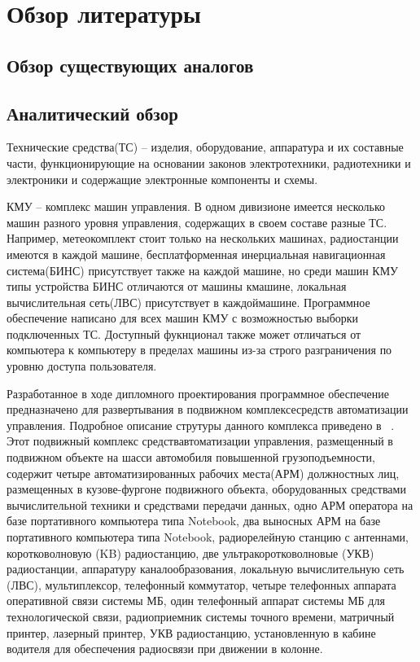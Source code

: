 \section{Обзор литературы}
\label{sec:lit_review}

\subsection{Обзор существующих аналогов}
\label{sub:lit_review:analogues}
\Blindtext

\subsection{Аналитический обзор}
\label{sub:lit_review:analitics}
\begin{minipage}
Технические средства(ТС) --  изделия, оборудование, аппаратура и их составные части, функционирующие на основании законов электротехники, радиотехники и электроники и содержащие электронные компоненты и \break схемы.

КМУ -- комплекс машин управления.
В одном дивизионе имеется несколько машин разного уровня управления, содержащих в своем составе разные ТС.
Например, метеокомплект стоит только на нескольких машинах, радиостанции имеются в каждой машине, бесплатформенная инерциальная навигационная система(БИНС) присутствует также на каждой машине, но среди машин КМУ типы устройства БИНС отличаются от машины к\break машине, локальная вычислительная сеть(ЛВС) присутствует в каждой\break машине.
Программное обеспечение написано для всех машин КМУ с \break возможностью выборки подключенных ТС.
Доступный фукнционал также может отличаться от компьютера к компьютеру в пределах машины из-за строго разграничения по уровню доступа пользователя.

Разработанное в ходе дипломного проектирования программное \break обеспечение предназначено для развертывания в подвижном комплексе\break средств автоматизации управления.
Подробное описание струтуры данного комплекса приведено в ~\cite{patent_2263960}.
Этот подвижный комплекс средств\break автоматизации управления, размещенный в подвижном объекте на шасси автомобиля повышенной грузоподъемности, содержит четыре автоматизированных рабочих места(АРМ) должностных лиц, размещенных в кузове-фургоне подвижного объекта, оборудованных средствами вычислительной техники и средствами передачи данных, одно АРМ оператора на базе портативного компьютера типа Notebook, два выносных АРМ на базе портативного компьютера типа Notebook, радиорелейную станцию с антеннами, коротковолновую (KB) радиостанцию, две ультракоротковолновые (УКВ) радиостанции, аппаратуру каналообразования, локальную вычислительную сеть (ЛВС), мультиплексор, телефонный коммутатор, четыре телефонных аппарата оперативной связи системы МБ, один телефонный аппарат системы МБ для технологической связи, радиоприемник системы точного времени, матричный принтер, лазерный принтер, УКВ радиостанцию, установленную в кабине водителя для обеспечения радиосвязи при движении в колонне.


\end{minipage}
